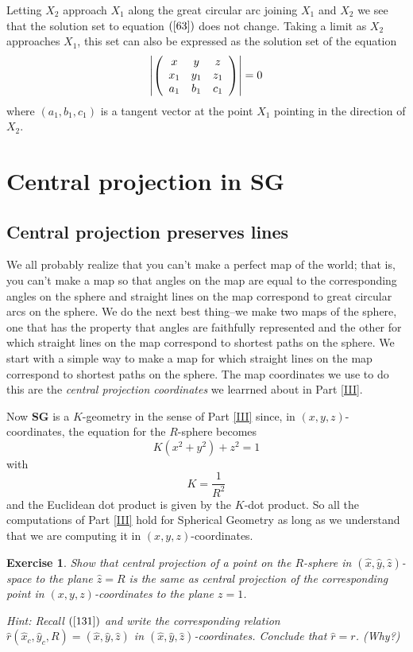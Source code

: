 \documentclass{article}%
\newtheorem{exercise}[theorem]{Exercise}
\begin{document}
Letting $X_{2}$ approach $X_{1}$ along the great circular arc joining $X_{1}$
and $X_{2}$ we see that the solution set to equation $\left(  \ref{63}\right)
$ does not change. Taking a limit as $X_{2}$ approaches $X_{1}$, this set can
also be expressed as the solution set of the equation%
\[
\left\vert \left(
\begin{array}
[c]{ccc}%
x & y & z\\
x_{1} & y_{1} & z_{1}\\
a_{1} & b_{1} & c_{1}%
\end{array}
\right)  \right\vert =0
\]
where $\left(  a_{1},b_{1},c_{1}\right)  $ is a tangent vector at the point
$X_{1}$ pointing in the direction of $X_{2}.$\pagebreak

\section{Central projection in \textbf{SG}}

\subsection{Central projection preserves lines}

We all probably realize that you can't make a perfect map of the world; that
is, you can't make a map so that angles on the map are equal to the
corresponding angles on the sphere and straight lines on the map correspond to
great circular arcs on the sphere. We do the next best thing--we make two maps
of the sphere, one that has the property that angles are faithfully
represented and the other for which straight lines on the map correspond to
shortest paths on the sphere. We start with a simple way to make a map for
which straight lines on the map correspond to shortest paths on the sphere.
The map coordinates we use to do this are the \textit{central projection
coordinates} we learrned about in Part \ref{III}.

Now \textbf{SG} is a $K$-geometry in the sense of Part \ref{III} since, in
$\left(  x,y,z\right)  $-coordinates, the equation for the $R$-sphere becomes%
\[
K\left(  x^{2}+y^{2}\right)  +z^{2}=1
\]
with%
\[
K=\frac{1}{R^{2}}%
\]
and the Euclidean dot product is given by the $K$-dot product. So all the
computations of Part \ref{III} hold for Spherical Geometry as long as we
understand that we are computing it in $\left(  x,y,z\right)  $-coordinates.

\begin{exercise}
Show that central projection of a point on the $R$-sphere in $\left(  \hat
{x},\hat{y},\hat{z}\right)  $-space to the plane $\hat{z}=R$ is the same as
central projection of the corresponding point in $\left(  x,y,z\right)
$-coordinates to the plane $z=1$.

Hint: Recall $\left(  \ref{131}\right)  $ and write the corresponding relation
$\hat{r}\left(  \hat{x}_{c},\hat{y}_{c},R\right)  =\left(  \hat{x},\hat
{y},\hat{z}\right)  $ in $\left(  \hat{x},\hat{y},\hat{z}\right)
$-coordinates. Conclude that $\hat{r}=r$. (Why?)
\end{exercise}
\end{document}
